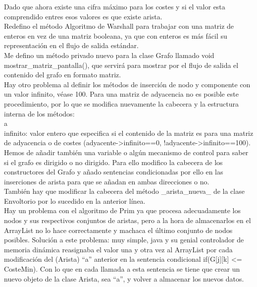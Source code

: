 \begin{itemize}
Dado que ahora existe una cifra máximo para los costes y si el valor esta comprendido entres esos valores es que existe arista.\\

Redefino el método Algoritmo de Warshall para trabajar con una matriz de enteros en vez de una matriz booleana, ya que con enteros es más fácil su representación en el flujo de salida estándar.\\

Me defino un método privado nuevo para la clase Grafo llamado void mostrar\_matriz\_pantalla(), que servirá para mostrar por el flujo de salida el contenido del grafo en formato matriz.\\

Hay otro problema al definir los métodos de inserción de nodo y componente con un valor infinito, véase 100. Para una matriz de adyacencia no es posible este procedimiento, por lo que se modifica nuevamente la cabecera y la estructura interna de los métodos:\\



a\\



infinito: valor entero que especifica si el contenido de la matriz es para una matriz de adyacencia o de costes (adyacente->infinito==0, !adyacente->infinito==100).\\

Hemos de añadir también una variable o algún mecanismo de control para saber si el grafo es dirigido o no dirigido. Para ello modifico la cabecera de los constructores del Grafo y añado sentencias condicionadas por ello en las inserciones de arista para que se añadan en ambas direcciones o no.\\

También hay que modificar la cabecera del método \_arista\_nueva\_ de la clase Envoltorio por lo sucedido en la anterior línea.\\



Hay un problema con el algoritmo de Prim ya que procesa adecuadamente los nodos y sus respectivos conjuntos de aristas, pero a la hora de almacenarlos en el ArrayList no lo hace correctamente y machaca el último conjunto de nodos posibles.
Solución a este problema: muy simple, java y su genial controlador de memoria dinámica reasignaba el valor una y otra vez al ArrayList por cada modificación del (Arista) ``a'' anterior en la sentencia condicional if(G[j][k] <= CosteMin). Con lo que en cada llamada a esta sentencia se tiene que crear un nuevo objeto de la clase Arista, sea ``a'', y volver a almacenar los nuevos datos.\\


\end{itemize}

